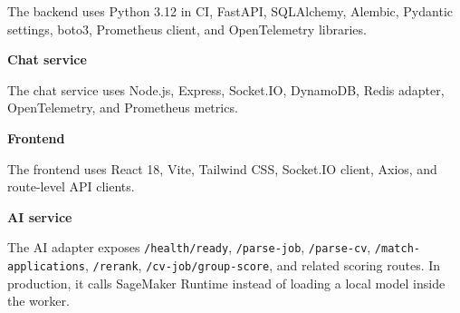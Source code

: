 The backend uses Python 3.12 in CI, FastAPI, SQLAlchemy, Alembic,
Pydantic settings, boto3, Prometheus client, and OpenTelemetry
libraries.

\vspace{0.5em}\noindent\textbf{Chat service}\par

\begin{Shaded}
\begin{Highlighting}[]
\end{Highlighting}
\end{Shaded}

The chat service uses Node.js, Express, Socket.IO, DynamoDB, Redis
adapter, OpenTelemetry, and Prometheus metrics.

\vspace{0.5em}\noindent\textbf{Frontend}\par

\begin{Shaded}
\begin{Highlighting}[]
\end{Highlighting}
\end{Shaded}

The frontend uses React 18, Vite, Tailwind CSS, Socket.IO client, Axios,
and route-level API clients.

\vspace{0.5em}\noindent\textbf{AI service}\par

\begin{Shaded}
\begin{Highlighting}[]
\end{Highlighting}
\end{Shaded}

The AI adapter exposes \texttt{/\allowbreak{}health/\allowbreak{}ready}, \texttt{/\allowbreak{}parse-\allowbreak{}job},
\texttt{/\allowbreak{}parse-\allowbreak{}cv}, \texttt{/\allowbreak{}match-\allowbreak{}applications}, \texttt{/\allowbreak{}rerank},
\texttt{/\allowbreak{}cv-\allowbreak{}job/\allowbreak{}group-\allowbreak{}score}, and related scoring routes. In production,
it calls SageMaker Runtime instead of loading a local model inside the
worker.

